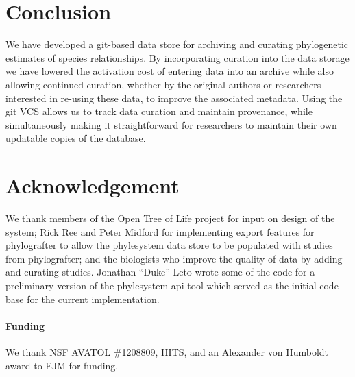 \documentclass{bioinfo}
\newcommand{\ps}{phylesystem\xspace}
\newcommand{\otol}{Open Tree of Life\xspace}
\begin{document}
\section{Conclusion}
We have developed a git-based data store for archiving and curating phylogenetic estimates of species relationships.
By incorporating curation into the data storage we have lowered the activation cost of entering data into
    an archive while also allowing continued curation, whether by the original authors or researchers
    interested in re-using these data, to improve the associated metadata.
Using the git VCS allows us to track data curation and maintain provenance, while simultaneously making it straightforward
    for researchers to maintain their own updatable copies of the database.

\section*{Acknowledgement}
We thank members of the \otol project for input on design of the system;
Rick Ree and Peter Midford for implementing export features for phylografter to allow the \ps
    data store to be populated with studies from phylografter; and 
the biologists who improve the quality of data by adding and curating studies.
Jonathan ``Duke'' Leto wrote some of the code for a preliminary version of the \ps-api tool
    which served as the initial code base for the current implementation.
\paragraph{Funding\textcolon} We thank NSF AVATOL \#1208809, HITS, and an Alexander von Humboldt award to EJM for funding.


\end{document}
